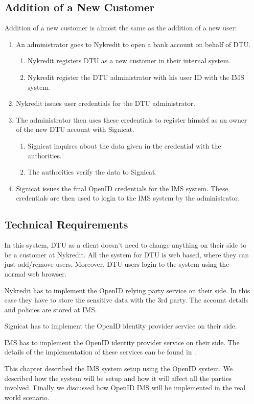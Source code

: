 \FloatBarrier
\subsection{Addition of a New Customer}
Addition of a new customer is almost the same as the addition of a new user:
\begin{enumerate}
	\item An administrator goes to Nykredit to open a bank account on behalf of DTU. 
	\begin{enumerate}
		\item Nykredit registers DTU as a new customer in their internal system.
		\item Nykredit register the DTU administrator with his user ID with the IMS system.
	\end{enumerate}
	\item Nykredit issues user credentials for the  DTU administrator.
	\item The administrator then uses these credentials to register himslef as an owner of the new DTU account with Signicat. 
	\begin{enumerate}
		\item Signicat inquires about the data given in the credential with the authorities.
		\item The authorities verify the data to Signicat.
	\end{enumerate}
	\item Signicat issues the final OpenID credentials for the IMS system. These credentials are then used to login to the IMS system by the administrator.
\end{enumerate}
\subsection{Technical Requirements}
In this system, DTU as a client doesn't need to change anything on their side to be a customer at Nykredit. All the system for DTU is web based, where they can just add/remove users. Moreover, DTU users login to the system using the normal web browser.

Nykredit has to implement the OpenID relying party service on their side. In this case they have to store the sensitive data with the 3rd party. The account details and policies are stored at IMS.

Signicat has to implement the OpenID identity provider service on their side.

IMS has to implement the OpenID identity provider service on their side.
The details of the implementation of these services can be found in \cite{recordon2006openid}.

This chapter described the IMS system setup using the OpenID system. We described how the system will be setup and how it will affect all the parties involved. Finally we discussed how OpenID IMS will be implemented in the real world scenario.

